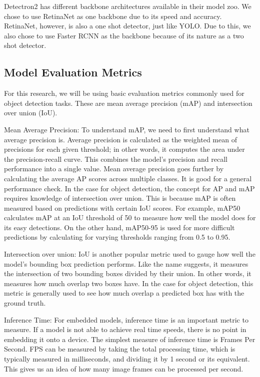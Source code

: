 \documentclass[stu,12pt,floatsintext]{apa7}
\begin{document}
Detectron2 has different backbone architectures available in their model zoo. We chose to use RetinaNet as one backbone due to its speed and accuracy. RetinaNet, however, is also a one shot detector, just like YOLO. Due to this, we also chose to use Faster RCNN as the backbone because of its nature as a two shot detector.

\subsection{Model Evaluation Metrics}
For this research, we will be using basic evaluation metrics commonly used for object detection tasks. These are mean average precision (mAP) and intersection over union (IoU).

Mean Average Precision: To understand mAP, we need to first understand what average precision is. Average precision is calculated as the weighted mean of precisions for each given threshold; in other words, it computes the area under the precision-recall curve. This combines the model's precision and recall performance into a single value. Mean average precision goes further by calculating the average AP scores across multiple classes. It is good for a general performance check. In the case for object detection, the concept for AP and mAP requires knowledge of intersection over union. This is because mAP is often measured based on predictions with certain IoU scores. For example, mAP50 calculates mAP at an IoU threshold of 50 to measure how well the model does for its easy detections. On the other hand, mAP50-95 is used for more difficult predictions by calculating for varying thresholds ranging from 0.5 to 0.95.

Intersection over union: IoU is another popular metric used to gauge how well the model's bounding box prediction performs. Like the name suggests, it measures the intersection of two bounding boxes divided by their union. In other words, it measures how much overlap two boxes have. In the case for object detection, this metric is generally used to see how much overlap a predicted box has with the ground truth.

Inference Time: For embedded models, inference time is an important metric to measure. If a model is not able to achieve real time speeds, there is no point in embedding it onto a device. The simplest measure of inference time is Frames Per Second. FPS can be measured by taking the total processing time, which is typically measured in milliseconds, and dividing it by 1 second or its equivalent. This gives us an idea of how many image frames can be processed per second.
\end{document}
